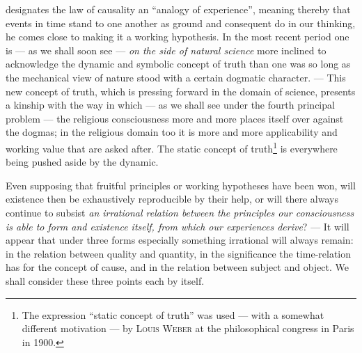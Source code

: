 \documentclass[12pt,a4paper]{book}
\begin{document}
designates the law of causality an ``analogy of experience'', meaning thereby
that events in time stand to one another as ground and consequent do in our
thinking, he comes close to making it a working hypothesis. In the most recent
period one is --- as we shall soon see --- \emph{on the side of natural science}
more inclined to acknowledge the dynamic and symbolic concept of truth than one
was so long as the mechanical view of nature stood with a certain dogmatic
character. --- This new concept of truth, which is pressing forward in the
domain of science, presents a kinship with the way in which --- as we shall see
under the fourth principal problem --- the religious consciousness more and more
places itself over against the dogmas; in the religious domain too it is more
and more applicability and working value that are asked after. The static
concept of truth\footnote{The expression ``static concept of truth'' was used
--- with a somewhat different motivation --- by \textsc{Louis Weber} at the
philosophical congress in Paris in 1900.} is everywhere being pushed aside by
the dynamic.

Even supposing that fruitful principles or working hypotheses have been won,
will existence then be exhaustively reproducible by their help, or will there
always continue to subsist \emph{an irrational relation between the principles
our consciousness is able to form and existence itself, from which our
experiences derive}? --- It will appear that under three forms especially
something irrational will always remain: in the relation between quality and
quantity, in the significance the time-relation has for the concept of cause,
and in the relation between subject and object. We shall consider these three
points each by itself.
\end{document}
